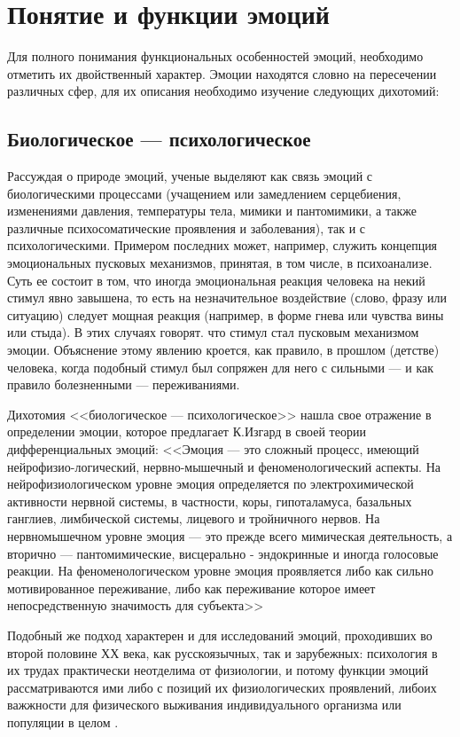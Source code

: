 \documentclass{../../common/thesisbyxetex}
\begin{document}
\tableofcontents 
\section{Понятие и функции эмоций}
Для полного понимания функциональных особенностей эмоций, необходимо отметить их 
двойственный характер. Эмоции находятся словно на пересечении различных сфер, для их описания 
необходимо изучение следующих дихотомий:

 \subsection*{Биологическое --- психологическое}
  
Рассуждая о природе эмоций, ученые выделяют как связь эмоций  с биологическими процессами 
(учащением или замедлением серцебиения, изменениями давления, температуры тела, мимики и 
пантомимики, а также различные психосоматические проявления и заболевания), так и с 
психологическими. Примером последних может, например, служить концепция эмоциональных пусковых 
механизмов, принятая, в том числе, в психоанализе. Суть ее состоит в том, что иногда эмоциональная 
реакция человека на некий стимул явно завышена, то есть на незначительное воздействие 
(слово, фразу или ситуацию) следует мощная реакция (например, в форме гнева или чувства вины или 
стыда). В этих случаях говорят. что стимул стал пусковым механизмом эмоции. Объяснение этому 
явлению 
кроется, как правило, в прошлом (детстве) человека, когда подобный стимул был сопряжен для него с 
сильными --- и как правило болезненными --- переживаниями. 

Дихотомия <<биологическое --- 
психологическое>> нашла свое отражение в определении эмоции, которое предлагает К.Изгард в своей 
теории дифференциальных эмоций: <<Эмоция --- это сложный процесс, имеющий нейрофизио-логический, 
нервно-мышечный и феноменологический аспекты. На нейрофизиологическом уровне эмоция определяется по 
электрохимической активности нервной системы, в частности, коры, гипоталамуса, базальных ганглиев, 
лимбической системы, лицевого и тройничного нервов. На нервномышечном уровне эмоция --- это прежде 
всего мимическая деятельность, а вторично — пантомимические, висцерально - эндокринные и иногда 
голосовые реакции. На феноменологическом уровне эмоция проявляется либо как сильно мотивированное 
переживание, либо как переживание которое имеет непосредственную значимость для субъекта>> 
\cite[65]{tde}

Подобный же подход характерен и для  исследований эмоций, проходивших во второй половине ХХ века, 
как русскоязычных, так и зарубежных: психология в их трудах практически неотделима от физиологии, и 
потому функции эмоций рассматриваются ими либо с позиций их физиологических проявлений, либоих 
важжности для физического выживания индивидуального организма или популяции в целом 
\cite{sem,ilemo,dode, gel}.
\end{document}
